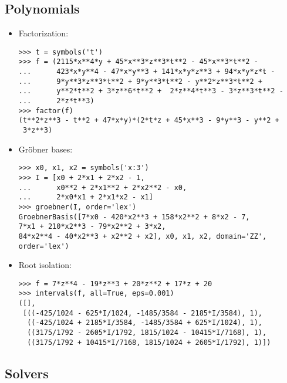 \subsection{Polynomials}
\begin{itemize}
\item Factorization:
\begin{verbatim}
>>> t = symbols('t')
>>> f = (2115*x**4*y + 45*x**3*z**3*t**2 - 45*x**3*t**2 -
...      423*x*y**4 - 47*x*y**3 + 141*x*y*z**3 + 94*x*y*z*t -
...      9*y**3*z**3*t**2 + 9*y**3*t**2 - y**2*z**3*t**2 +
...      y**2*t**2 + 3*z**6*t**2 +  2*z**4*t**3 - 3*z**3*t**2 -
...      2*z*t**3)
>>> factor(f)
(t**2*z**3 - t**2 + 47*x*y)*(2*t*z + 45*x**3 - 9*y**3 - y**2 +
 3*z**3)
\end{verbatim}

\item Gr\"{o}bner bases:
\begin{verbatim}
>>> x0, x1, x2 = symbols('x:3')
>>> I = [x0 + 2*x1 + 2*x2 - 1,
...      x0**2 + 2*x1**2 + 2*x2**2 - x0,
...      2*x0*x1 + 2*x1*x2 - x1]
>>> groebner(I, order='lex')
GroebnerBasis([7*x0 - 420*x2**3 + 158*x2**2 + 8*x2 - 7,
7*x1 + 210*x2**3 - 79*x2**2 + 3*x2,
84*x2**4 - 40*x2**3 + x2**2 + x2], x0, x1, x2, domain='ZZ',
order='lex')
\end{verbatim}

\item Root isolation:
\begin{verbatim}
>>> f = 7*z**4 - 19*z**3 + 20*z**2 + 17*z + 20
>>> intervals(f, all=True, eps=0.001)
([],
 [((-425/1024 - 625*I/1024, -1485/3584 - 2185*I/3584), 1),
  ((-425/1024 + 2185*I/3584, -1485/3584 + 625*I/1024), 1),
  ((3175/1792 - 2605*I/1792, 1815/1024 - 10415*I/7168), 1),
  ((3175/1792 + 10415*I/7168, 1815/1024 + 2605*I/1792), 1)])
\end{verbatim}
\end{itemize}
\subsection{Solvers}

